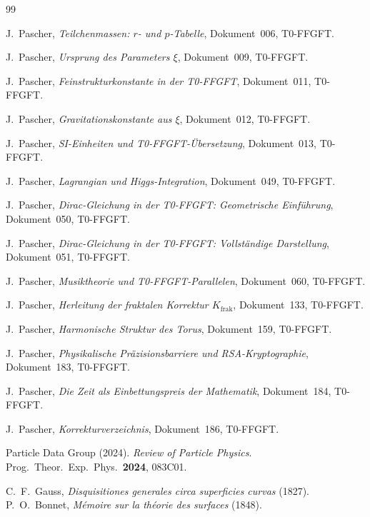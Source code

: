 \begin{thebibliography}{99}

J.~Pascher,
\textit{Teilchenmassen: $r$- und $p$-Tabelle},
Dokument~006, T0-FFGFT.

J.~Pascher,
\textit{Ursprung des Parameters $\xi$},
Dokument~009, T0-FFGFT.

J.~Pascher,
\textit{Feinstrukturkonstante in der T0-FFGFT},
Dokument~011, T0-FFGFT.

J.~Pascher,
\textit{Gravitationskonstante aus $\xi$},
Dokument~012, T0-FFGFT.

J.~Pascher,
\textit{SI-Einheiten und T0-FFGFT-Übersetzung},
Dokument~013, T0-FFGFT.

J.~Pascher,
\textit{Lagrangian und Higgs-Integration},
Dokument~049, T0-FFGFT.

J.~Pascher,
\textit{Dirac-Gleichung in der T0-FFGFT: Geometrische Einführung},
Dokument~050, T0-FFGFT.

J.~Pascher,
\textit{Dirac-Gleichung in der T0-FFGFT: Vollständige Darstellung},
Dokument~051, T0-FFGFT.

J.~Pascher,
\textit{Musiktheorie und T0-FFGFT-Parallelen},
Dokument~060, T0-FFGFT.

J.~Pascher,
\textit{Herleitung der fraktalen Korrektur $K_{\text{frak}}$},
Dokument~133, T0-FFGFT.

J.~Pascher,
\textit{Harmonische Struktur des Torus},
Dokument~159, T0-FFGFT.

J.~Pascher,
\textit{Physikalische Präzisionsbarriere und RSA-Kryptographie},
Dokument~183, T0-FFGFT.

J.~Pascher,
\textit{Die Zeit als Einbettungspreis der Mathematik},
Dokument~184, T0-FFGFT.

J.~Pascher,
\textit{Korrekturverzeichnis},
Dokument~186, T0-FFGFT.

Particle Data Group (2024).
\textit{Review of Particle Physics}.
Prog.\ Theor.\ Exp.\ Phys.\ \textbf{2024}, 083C01.

C.~F.~Gauss,
\textit{Disquisitiones generales circa superficies curvas} (1827).
P.~O.~Bonnet,
\textit{Mémoire sur la théorie des surfaces} (1848).

\end{thebibliography}
